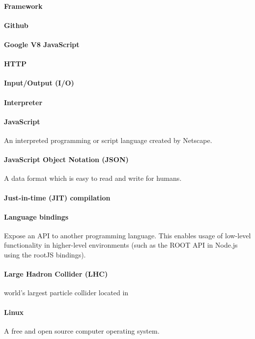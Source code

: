 \paragraph{Framework}
\paragraph{Github}
\paragraph{Google V8 JavaScript}
\paragraph{HTTP}
\paragraph{Input/Output (I/O)}
\paragraph{Interpreter}
\paragraph{JavaScript}
An interpreted programming or script language created by Netscape.
\paragraph{JavaScript Object Notation (JSON)}
A data format which is easy to read and write for humans.
\paragraph{Just-in-time (JIT) compilation}
\paragraph{Language bindings}
Expose an API to another programming language. This enables usage of low-level functionality in higher-level environments (such as the ROOT API in Node.js using the rootJS bindings).
\paragraph{Large Hadron Collider (LHC)}
world's largest particle collider located in
\paragraph{Linux}
A free and open source computer operating system.
